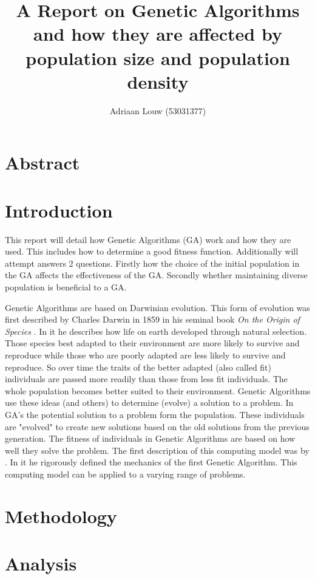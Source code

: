 \documentclass[12pt,a4paper]{report}
\title{A Report on Genetic Algorithms and how they are affected by population size and population density}
\author{ Adriaan Louw (53031377) }
\begin{document}
\maketitle

\tableofcontents

\section{Abstract}

\section{Introduction}

This report will detail how Genetic Algorithms (GA) work and how they are used. This includes how to determine a good fitness function. Additionally will attempt answers 2 questions. Firstly how the choice of the initial population in the GA affects the effectiveness of the GA. Secondly whether maintaining diverse population is beneficial to a GA. 

Genetic Algorithms are based on Darwinian evolution. This form of evolution was first described by Charles Darwin in 1859 in his seminal book \textit{On the Origin of Species} \citep{darwin}. In it he describes how life on earth developed through natural selection. Those species best adapted to their environment are more likely to survive and reproduce while those who are poorly adapted are less likely to survive and reproduce. So over time the traits of the better adapted (also called fit) individuals are passed more readily than those from less fit individuals. The whole population becomes better suited to their environment. Genetic Algorithms use these ideas (and others) to determine (evolve) a solution to a problem. In GA's the potential solution to a problem form the population. These individuals are "evolved" to create new solutions based on the old solutions from the previous generation. The fitness of individuals in Genetic Algorithms are based on how well they solve the problem. The first description of this computing model was by \cite{holland}. In it he rigorously defined the mechanics of the first Genetic Algorithm. This computing model can be applied to a varying range of problems. 

\section{Methodology}

\section{Analysis}
\end{document}
